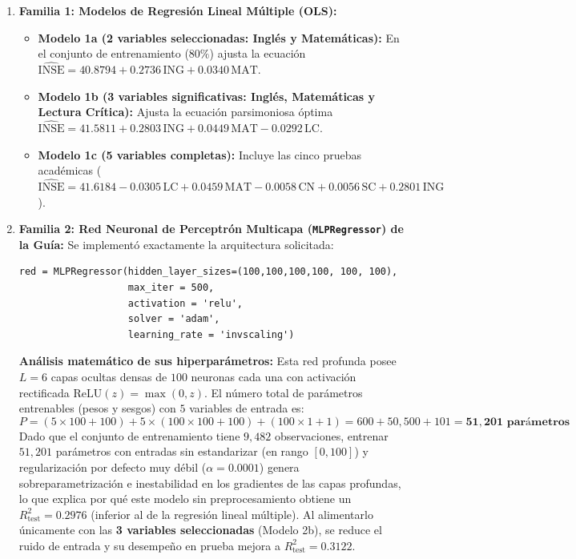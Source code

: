 \documentclass[11pt,letterpaper]{article}
\begin{document}
\begin{enumerate}
    \item \textbf{Familia 1: Modelos de Regresión Lineal Múltiple (OLS):}
    \begin{itemize}
        \item \textbf{Modelo 1a (2 variables seleccionadas: Inglés y Matemáticas):} En el conjunto de entrenamiento ($80\%$) ajusta la ecuación $\widehat{\text{INSE}} = 40.8794 + 0.2736\,\text{ING} + 0.0340\,\text{MAT}$.
        \item \textbf{Modelo 1b (3 variables significativas: Inglés, Matemáticas y Lectura Crítica):} Ajusta la ecuación parsimoniosa óptima $\widehat{\text{INSE}} = 41.5811 + 0.2803\,\text{ING} + 0.0449\,\text{MAT} - 0.0292\,\text{LC}$.
        \item \textbf{Modelo 1c (5 variables completas):} Incluye las cinco pruebas académicas ($\widehat{\text{INSE}} = 41.6184 - 0.0305\,\text{LC} + 0.0459\,\text{MAT} - 0.0058\,\text{CN} + 0.0056\,\text{SC} + 0.2801\,\text{ING}$).
    \end{itemize}
    
    \item \textbf{Familia 2: Red Neuronal de Perceptrón Multicapa (\texttt{MLPRegressor}) de la Guía:}
    Se implementó exactamente la arquitectura solicitada:
\begin{verbatim}
red = MLPRegressor(hidden_layer_sizes=(100,100,100,100, 100, 100),
                   max_iter = 500,
                   activation = 'relu',
                   solver = 'adam',
                   learning_rate = 'invscaling')
\end{verbatim}
    \textbf{Análisis matemático de sus hiperparámetros:} Esta red profunda posee $L = 6$ capas ocultas densas de $100$ neuronas cada una con activación rectificada $\text{ReLU}(z) = \max(0, z)$. El número total de parámetros entrenables (pesos y sesgos) con $5$ variables de entrada es:
    \begin{equation}
    P = (5 \times 100 + 100) + 5 \times (100 \times 100 + 100) + (100 \times 1 + 1) = 600 + 50,500 + 101 = \mathbf{51,201 \text{ parámetros}}
    \end{equation}
    Dado que el conjunto de entrenamiento tiene $9,482$ observaciones, entrenar $51,201$ parámetros con entradas sin estandarizar (en rango $[0, 100]$) y regularización por defecto muy débil ($\alpha = 0.0001$) genera sobreparametrización e inestabilidad en los gradientes de las capas profundas, lo que explica por qué este modelo sin preprocesamiento obtiene un $R^2_{\text{test}} = 0.2976$ (inferior al de la regresión lineal múltiple). Al alimentarlo únicamente con las \textbf{3 variables seleccionadas} (Modelo 2b), se reduce el ruido de entrada y su desempeño en prueba mejora a $R^2_{\text{test}} = 0.3122$.


\end{enumerate}
\end{document}
